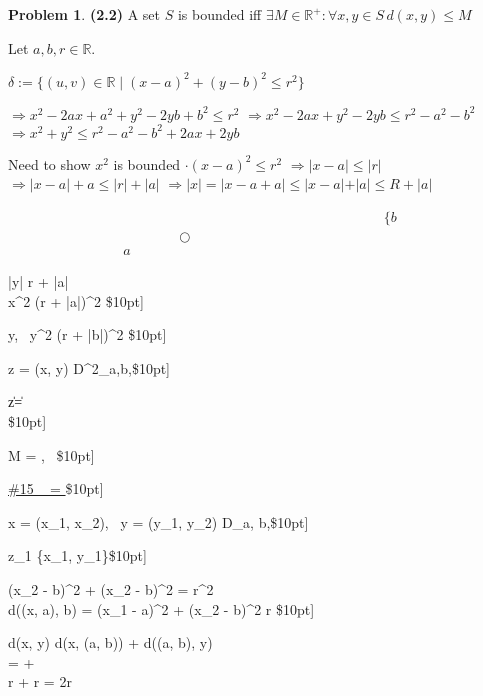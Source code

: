 \documentclass{article}
\theoremstyle{definition}
\newtheorem{problem}[theorem]{Problem}
\numberwithin{equation}{section}
\begin{document}
\begin{problem}
\textbf{(2.2)} A set \( S \) is bounded iff \( \exists M \in \mathbb{R}^+ : \forall x, y \in S \, d(x, y) \leq M \)

Let \( a, b, r \in \mathbb{R}\).

$\delta := \{ (u, v) \in \mathbb{R} \mid (x - a)^2 + (y - b)^2 \leq r^2 \}$

$
\Rightarrow x^2 - 2ax + a^2 + y^2 - 2yb + b^2 \leq r^2
$
$
\Rightarrow x^2 - 2ax + y^2 - 2yb \leq r^2 - a^2 - b^2
$
$
\Rightarrow x^2 + y^2 \leq r^2 - a^2 - b^2 + 2ax + 2yb
$

Need to show \( x^2 \) is bounded
$ \cdot (x - a)^2 \leq r^2 $
$
\Rightarrow \vert x - a \vert \leq \vert r \vert
$
$
\Rightarrow \vert x - a \vert + a \leq \vert r \vert + |a|
$
$
\Rightarrow \vert x \vert = \vert x - a + a \vert \leq \vert x - a \vert + \vert a \vert \leq R + |a|
$

\begin{align*}
&\quad\quad\quad\quad\quad\quad\quad\quad\quad\quad\quad\quad\quad \{ b\\ \quad \quad\quad\quad \bigcirc \\
a
\end{align*}

\Rightarrow |y| \leq r + |a| \\
\Rightarrow x^2 \leq (r + |a|)^2 \$10pt]

 y, \ y^2 \leq (r + |b|)^2 \$10pt]

\forall z = (x, y) \in D^2_{a,b},\$10pt]

\|z\| = \\
\quad \quad \quad \leq {} \$10pt]

 M = , \ \$10pt]

\underline{\#15 \  = }\$10pt]

 x = (x_1, x_2), \ y = (y_1, y_2) \in D_{a, b},\$10pt]

z_1 \in \{x_1, y_1\}\$10pt]

(x_2 - b)^2 + (x_2 - b)^2 = r^2\\
\Rightarrow d((x, a), b) = \parallel(x_1 - a)^2 + (x_2 - b)^2 \parallel \leq r \$10pt]

\Rightarrow d(x, y) \leq d(x, (a, b)) + d((a, b), y)\\
=  + \\
\Rightarrow r + r = 2r\\


\end{problem}
\end{document}
